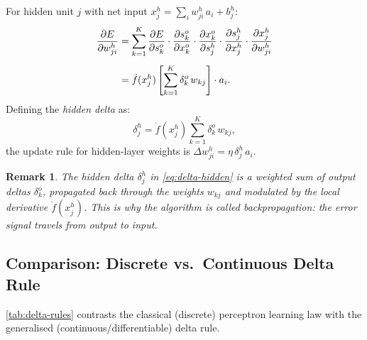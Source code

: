 \documentclass[12pt,a4paper]{article}
\newtheorem{remark}{Remark}[section]
\begin{document}
For hidden unit $j$ with net input $x_j^h = \sum_i w_{ji}^h\,a_i + b_j^h$:
\begin{align}
  \frac{\partial E}{\partial w_{ji}^h}
    &= \sum_{k=1}^{K}
       \frac{\partial E}{\partial s_k^o}
       \cdot\frac{\partial s_k^o}{\partial x_k^o}
       \cdot\frac{\partial x_k^o}{\partial s_j^h}
       \cdot\frac{\partial s_j^h}{\partial x_j^h}
       \cdot\frac{\partial x_j^h}{\partial w_{ji}^h} \notag \\[4pt]
    &= \dot{f}(x_j^h)
       \left[\sum_{k=1}^{K} \delta_k^o\,w_{kj}\right]
       \cdot a_i.
  \label{eq:hidden-grad}
\end{align}
Defining the \emph{hidden delta} as:
\begin{equation}
  \delta_j^h = \dot{f}(x_j^h)\sum_{k=1}^{K}\delta_k^o\,w_{kj},
  \label{eq:delta-hidden}
\end{equation}
the update rule for hidden-layer weights is $\Delta w_{ji}^h = \eta\,\delta_j^h\,a_i$.

\begin{remark}
  The hidden delta $\delta_j^h$ in \cref{eq:delta-hidden} is a weighted sum of
  \emph{output deltas} $\delta_k^o$, propagated back through the weights
  $w_{kj}$ and modulated by the local derivative $\dot{f}(x_j^h)$.  This is
  why the algorithm is called \emph{back}propagation: the error signal travels
  from output to input.
\end{remark}

\subsection{Comparison: Discrete vs.\ Continuous Delta Rule}
\label{subsec:discrete-vs-continuous}

\cref{tab:delta-rules} contrasts the classical (discrete) perceptron learning
law with the generalised (continuous/differentiable) delta rule.
\end{document}
